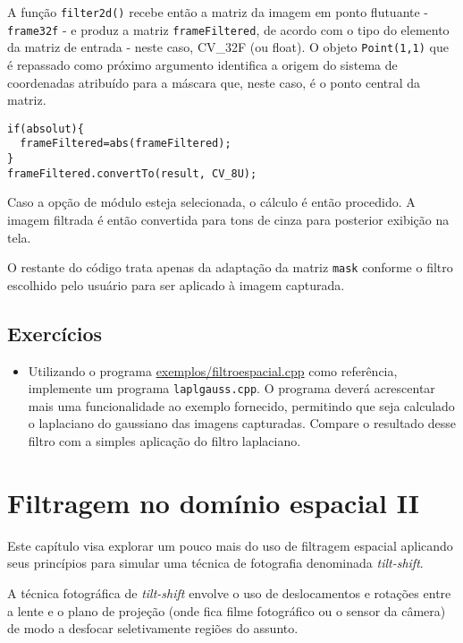 \documentclass[11pt]{amsbook}
\begin{document}
A função \texttt{filter2d()} recebe então a matriz da imagem em ponto
flutuante - \texttt{frame32f} - e produz a matriz \texttt{frameFiltered}, de acordo
com o tipo do elemento da matriz de entrada - neste caso, CV_32F (ou
float). O objeto \texttt{Point(1,1)} que é repassado como próximo argumento
identifica a origem do sistema de coordenadas atribuído para a
máscara que, neste caso, é o ponto central da matriz.


\begin{verbatim}
if(absolut){
  frameFiltered=abs(frameFiltered);
}
frameFiltered.convertTo(result, CV_8U);
\end{verbatim}

Caso a opção de módulo esteja selecionada, o cálculo é então
procedido. A imagem filtrada é então convertida para tons de cinza
para posterior exibição na tela.


O restante do código trata apenas da adaptação da matriz \texttt{mask}
conforme o filtro escolhido pelo usuário para ser aplicado à imagem
capturada.


\hypertarget{x-exercícios}{\section{Exercícios}}
\begin{itemize}

\item Utilizando o programa \href{exemplos/filtroespacial.cpp}{exemplos/filtroespacial.cpp} como
referência, implemente um programa \texttt{laplgauss.cpp}. O programa
deverá acrescentar mais uma funcionalidade ao exemplo fornecido,
permitindo que seja calculado o laplaciano do gaussiano das imagens
capturadas. Compare o resultado desse filtro com a simples aplicação
do filtro laplaciano.

\end{itemize}


\hypertarget{x-filtragem-no-domínio-espacial-ii}{\chapter{Filtragem no domínio espacial II}}
Este capítulo visa explorar um pouco mais do uso de filtragem espacial
aplicando seus princípios para simular uma técnica de fotografia denominada
\emph{tilt-shift}.


A técnica fotográfica de \emph{tilt-shift} envolve o uso de deslocamentos e
rotações entre a lente e o plano de projeção (onde fica filme
fotográfico ou o sensor da câmera) de modo a desfocar seletivamente
regiões do assunto.
\end{document}
